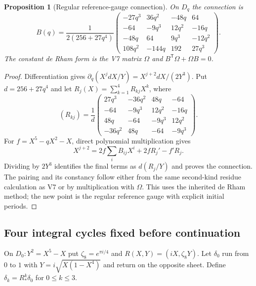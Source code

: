 \documentclass[11pt]{article}
\newtheorem{proposition}[proposition]{Proposition}
\theoremstyle{definition}
\theoremstyle{remark}
\begin{document}
\begin{proposition}[Regular reference-gauge connection]
\label{prop:v8-regular-connection}
On $D_q$ the connection is
\begin{equation}
 \boxed{B(q)=\frac1{2(256+27q^4)}
 \begin{pmatrix}
 -27q^3&36q^2&-48q&64\\
 -64&-9q^3&12q^2&-16q\\
 -48q&64&9q^3&-12q^2\\
 108q^2&-144q&192&27q^3
 \end{pmatrix}.}
 \label{eq:v8-B}
\end{equation}
The constant de Rham form is the V7 matrix $\Omega$ and
$B^{\mathsf T}\Omega+\Omega B=0$.
\end{proposition}
\begin{proof}
Differentiation gives $\partial_q(X^j dX/Y)=X^{j+2}dX/(2Y^3)$.
Put $d=256+27q^4$ and let $R_j(X)=\sum_{k=1}^4R_{kj}X^k$, where
\[
 (R_{kj})=\frac1d
 \begin{pmatrix}
 27q^3&-36q^2&48q&-64\\
 -64&-9q^3&12q^2&-16q\\
 48q&-64&-9q^3&12q^2\\
 -36q^2&48q&-64&-9q^3
 \end{pmatrix}.
\]
For $f=X^5-qX^2-X$, direct polynomial multiplication gives
\[
 X^{j+2}=2f\sum_iB_{ij}X^i+2fR_j'-f'R_j.
\]
Dividing by $2Y^3$ identifies the final terms as $d(R_j/Y)$ and proves
the connection. The pairing and its constancy follow either from the same
second-kind residue calculation as V7 or by multiplication with $\Omega$.
This uses the inherited de Rham method; the new point is the regular
reference gauge with explicit initial periods.
\end{proof}

\subsection{Four integral cycles fixed before continuation}
On $D_0:Y^2=X^5-X$ put $\zeta_8=e^{\pi i/4}$ and
$R(X,Y)=(iX,\zeta_8Y)$. Let $\delta_0$ run from $0$ to $1$ with
$Y=i\sqrt{X(1-X^4)}$ and return on the opposite sheet. Define
$\delta_k=R_*^k\delta_0$ for $0\le k\le3$.
\end{document}
